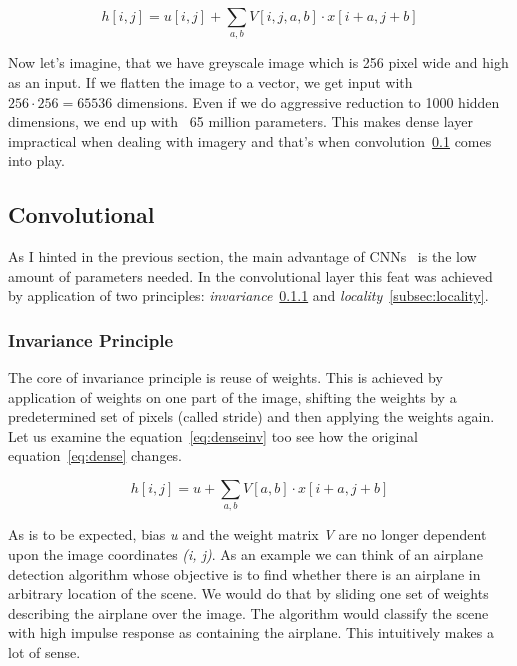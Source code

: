 \begin{equation}
    \label{eq:dense}
    h[i, j] = u[i,j] + \sum_{a,b} V[i,j,a,b] \cdot x[i+a,j+b]
\end{equation}

Now let's imagine, that we have greyscale image which is 256 pixel wide and high as an input.
If we flatten the image to a vector, we get input with $256\cdot256 = 65536$ dimensions.
Even if we do aggressive reduction to 1000 hidden dimensions, we end up with ~65 million parameters.
This makes dense layer impractical when dealing with imagery and that's when convolution~\ref{subsec:convolutional}
comes into play.

\subsection{Convolutional}\label{subsec:convolutional}
As I hinted in the previous section, the main advantage of CNNs~\cite{ConvLayer} is the low amount of parameters needed.
In the convolutional layer this feat was achieved by application of two principles:
\textit{invariance}~\ref{subsec:invariance} and \textit{locality}~\ref{subsec:locality}.

\subsubsection{Invariance Principle}\label{subsec:invariance}
The core of invariance principle is reuse of weights.
This is achieved by application of weights on one part of the image, shifting the weights by a predetermined set
of pixels (called stride) and then applying the weights again.
Let us examine the equation~\ref{eq:denseinv} too see how the original equation~\ref{eq:dense} changes.

\begin{equation}
    \label{eq:denseinv}
    h[i, j] = u + \sum_{a,b} V[a,b] \cdot x[i+a,j+b]
\end{equation}

As is to be expected, bias \textit{u} and the weight matrix \textit{V} are no longer dependent upon the image
coordinates \textit{(i, j)}.
As an example we can think of an airplane detection algorithm whose objective is to find whether there is an airplane
in arbitrary location of the scene.
We would do that by sliding one set of weights describing the airplane over the image.
The algorithm would classify the scene with high impulse response as containing the airplane.
This intuitively makes a lot of sense.

